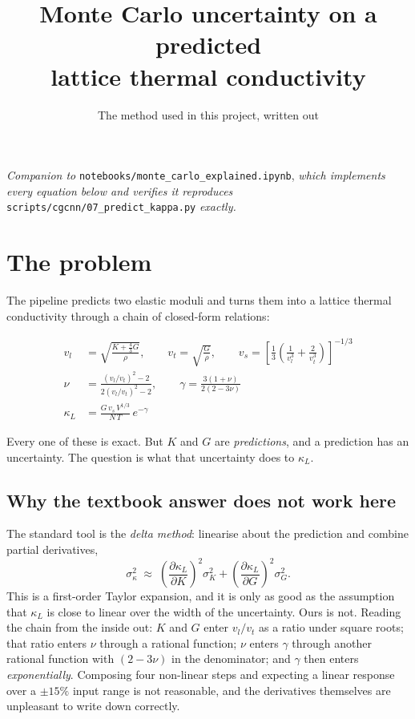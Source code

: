 \documentclass[11pt,a4paper]{article}
\title{\vspace{-1.4cm}Monte Carlo uncertainty on a predicted\\ lattice thermal conductivity}
\author{The method used in this project, written out}
\date{}
\begin{document}
\maketitle
\vspace{-0.8cm}

\noindent
\textit{Companion to} \texttt{notebooks/monte\_carlo\_explained.ipynb}, \textit{which
implements every equation below and verifies it reproduces}
\texttt{scripts/cgcnn/07\_predict\_kappa.py} \textit{exactly.}

\section{The problem}

The pipeline predicts two elastic moduli and turns them into a lattice thermal
conductivity through a chain of closed-form relations:

\begin{align}
v_l &= \sqrt{\frac{K + \tfrac{4}{3}G}{\rho}}, \qquad
v_t = \sqrt{\frac{G}{\rho}}, \qquad
v_s = \left[\frac{1}{3}\left(\frac{1}{v_l^{3}} + \frac{2}{v_t^{3}}\right)\right]^{-1/3} \\[4pt]
\nu &= \frac{(v_l/v_t)^2 - 2}{2(v_l/v_t)^2 - 2}, \qquad
\gamma = \frac{3(1+\nu)}{2(2-3\nu)} \\[4pt]
\kappa_L &= \frac{G\,v_s\,V^{1/3}}{N\,T}\,e^{-\gamma}
\end{align}

Every one of these is exact. But $K$ and $G$ are \emph{predictions}, and a prediction has
an uncertainty. The question is what that uncertainty does to $\kappa_L$.

\subsection{Why the textbook answer does not work here}

The standard tool is the \emph{delta method}: linearise about the prediction and combine
partial derivatives,
\[
\sigma_{\kappa}^2 \;\approx\;
\left(\frac{\partial \kappa_L}{\partial K}\right)^{\!2}\sigma_K^2 +
\left(\frac{\partial \kappa_L}{\partial G}\right)^{\!2}\sigma_G^2 .
\]
This is a first-order Taylor expansion, and it is only as good as the assumption that
$\kappa_L$ is close to linear over the width of the uncertainty. Ours is not. Reading the
chain from the inside out: $K$ and $G$ enter $v_l/v_t$ as a ratio under square roots; that
ratio enters $\nu$ through a rational function; $\nu$ enters $\gamma$ through another
rational function with $(2-3\nu)$ in the denominator; and $\gamma$ then enters
\emph{exponentially}. Composing four non-linear steps and expecting a linear response over
a $\pm 15\%$ input range is not reasonable, and the derivatives themselves are unpleasant
to write down correctly.
\end{document}
